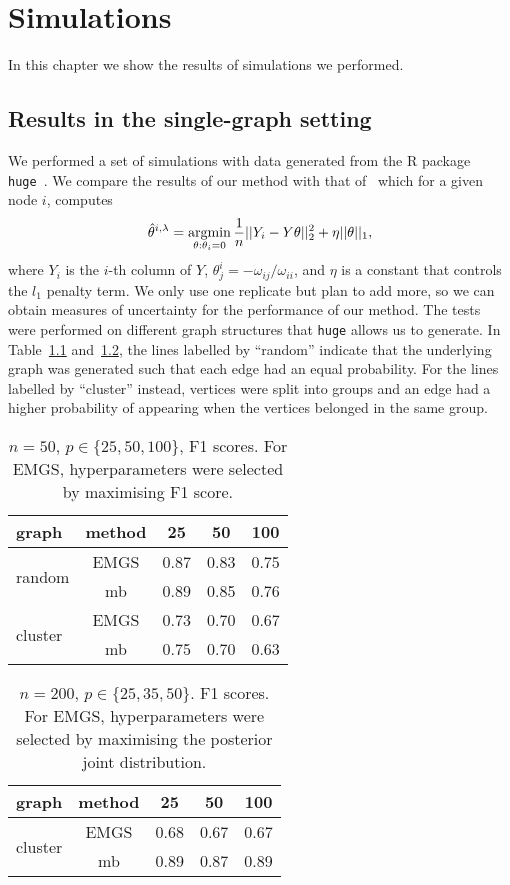 \documentclass[a4paper, 11pt, oneside]{report}
\DeclareMathOperator{\argmin}{argmin}
\newcommand{\1}{\mathds{1}}
\begin{document}
\chapter{Simulations}\label{chap:simualtions}
In this chapter we show the results of simulations we performed.
\section{Results in the single-graph setting}
We performed a set of simulations with data generated from the R package
\texttt{huge}~\parencite{huge2020}. We compare the results of our method with that of~\cite{mein2006} which for a given node $i$, computes
\[\hat{\theta}^{i, \lambda} = \argmin\displaylimits_{\theta : \theta_i = 0}\frac{1}{n} ||Y_i - Y \theta||_2^2 + \eta ||\theta||_1,\]
where $Y_i$ is the $i$-th column of $Y$, $\theta_j^i = -\omega_{ij}/\omega_{ii}$, and $\eta$ is a constant that controls the $l_1$ penalty term.
We only use one replicate but plan to add more, so we can obtain measures of uncertainty for the performance of our method.
The tests were performed on different graph structures that \texttt{huge} allows us to generate.
In Table~\ref{tab:cheat} and~\ref{tab:honest}, the lines labelled by ``random'' indicate that the
underlying graph was generated such that each edge had an equal probability. For the lines labelled by ``cluster'' instead, vertices were split
into groups and an edge had a higher probability of appearing when the vertices
belonged in the same group.
\begin{table}[ht]
	\centering
	\small
	\begin{tabular}{lcccc}
		\toprule
		graph                    & method & 25   & 50   & 100  \\
		\midrule
		\multirow{2}{*}{random}  & EMGS   & 0.87 & 0.83 & 0.75 \\
		                         & mb     & 0.89 & 0.85 & 0.76 \\
		\midrule
		\multirow{2}{*}{cluster} & EMGS   & 0.73 & 0.70 & 0.67 \\
		                         & mb     & 0.75 & 0.70 & 0.63 \\
		\bottomrule
	\end{tabular}
	\caption{$n=50$, $p \in \{25, 50, 100\}$, F1 scores. For EMGS, hyperparameters were selected by maximising F1 score.}\label{tab:cheat}
\end{table}
\begin{table}
	\centering
	\small
	\begin{tabular}{lcccc}
		\toprule
		graph                    & method & 25   & 50   & 100  \\
		\midrule
		\multirow{2}{*}{cluster} & EMGS   & 0.68 & 0.67 & 0.67 \\
		                         & mb     & 0.89 & 0.87 & 0.89 \\
		\bottomrule
	\end{tabular}
	\caption{$n=200$, $p \in \{25, 35, 50\}$. F1 scores. For EMGS, hyperparameters were selected by maximising the posterior joint distribution.}\label{tab:honest}
\end{table}
\end{document}
